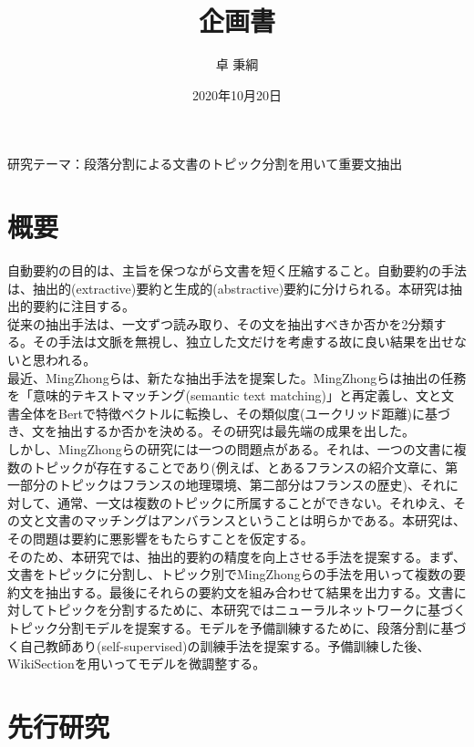 \documentclass[a4paper]{article}
\title{企画書}
\date{2020年10月20日}
\author{卓 秉綱}
\begin{document}
\maketitle
研究テーマ：段落分割による文書のトピック分割を用いて重要文抽出\\

\section{概要}
自動要約の目的は、主旨を保つながら文書を短く圧縮すること。自動要約の手法は、抽出的(extractive)要約と生成的(abstractive)要約に分けられる。本研究は抽出的要約に注目する。\\

従来の抽出手法は、一文ずつ読み取り、その文を抽出すべきか否かを2分類する。その手法は文脈を無視し、独立した文だけを考慮する故に良い結果を出せないと思われる。\\

最近、MingZhongら\cite{zhong2020extractive}は、新たな抽出手法を提案した。MingZhongらは抽出の任務を「意味的テキストマッチング(semantic text matching)」と再定義し、文と文書全体をBertで特徴ベクトルに転換し、その類似度(ユークリッド距離)に基づき、文を抽出するか否かを決める。その研究は最先端の成果を出した。\\

しかし、MingZhongらの研究には一つの問題点がある。それは、一つの文書に複数のトピックが存在することであり(例えば、とあるフランスの紹介文章に、第一部分のトピックはフランスの地理環境、第二部分はフランスの歴史)、それに対して、通常、一文は複数のトピックに所属することができない。それゆえ、その文と文書のマッチングはアンバランスということは明らかである。本研究は、その問題は要約に悪影響をもたらすことを仮定する。\\

そのため、本研究では、抽出的要約の精度を向上させる手法を提案する。まず、文書をトピックに分割し、トピック別でMingZhongらの手法を用いって複数の要約文を抽出する。最後にそれらの要約文を組み合わせて結果を出力する。文書に対してトピックを分割するために、本研究ではニューラルネットワークに基づくトピック分割モデルを提案する。モデルを予備訓練するために、段落分割に基づく自己教師あり(self-supervised)の訓練手法を提案する。予備訓練した後、WikiSection\cite{arnold2019sector}を用いってモデルを微調整する。\\

\section{先行研究}
\end{document}
